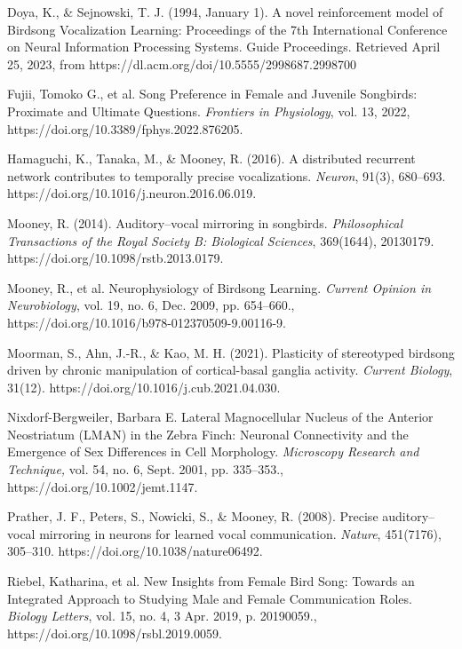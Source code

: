 \documentclass[12pt]{article}
\begin{document}
\newpage
\begin{thebibliography}{10}

 Doya, K., \& Sejnowski, T. J. (1994, January 1). A novel reinforcement model of Birdsong Vocalization Learning: Proceedings of the 7th International Conference on Neural Information Processing Systems. Guide Proceedings. Retrieved April 25, 2023, from https://dl.acm.org/doi/10.5555/2998687.2998700 

 Fujii, Tomoko G., et al. Song Preference in Female and Juvenile Songbirds: Proximate and Ultimate Questions.\textit{ Frontiers in Physiology}, vol. 13, 2022, https://doi.org/10.3389/fphys.2022.876205.

 Hamaguchi, K., Tanaka, M., \& Mooney, R. (2016). A distributed recurrent network contributes to temporally precise vocalizations. \textit{Neuron}, 91(3), 680–693. https://doi.org/10.1016/j.neuron.2016.06.019.

 Mooney, R. (2014). Auditory–vocal mirroring in songbirds. \textit{Philosophical Transactions of the Royal Society B: Biological Sciences}, 369(1644), 20130179. https://doi.org/10.1098/rstb.2013.0179.

 Mooney, R., et al. Neurophysiology of Birdsong Learning. \textit{Current Opinion in Neurobiology}, vol. 19, no. 6, Dec. 2009, pp. 654–660., https://doi.org/10.1016/b978-012370509-9.00116-9.

 Moorman, S., Ahn, J.-R., \& Kao, M. H. (2021). Plasticity of stereotyped birdsong driven by chronic manipulation of cortical-basal ganglia activity. \textit{Current Biology}, 31(12). https://doi.org/10.1016/j.cub.2021.04.030.

 Nixdorf-Bergweiler, Barbara E. Lateral Magnocellular Nucleus of the Anterior Neostriatum (LMAN) in the Zebra Finch: Neuronal Connectivity and the Emergence of Sex Differences in Cell Morphology. \textit{Microscopy Research and Technique,} vol. 54, no. 6, Sept. 2001, pp. 335–353., https://doi.org/10.1002/jemt.1147.

 Prather, J. F., Peters, S., Nowicki, S., \& Mooney, R. (2008). Precise auditory–vocal mirroring in neurons for learned vocal communication. \textit{Nature}, 451(7176), 305–310. https://doi.org/10.1038/nature06492.

 Riebel, Katharina, et al. New Insights from Female Bird Song: Towards an Integrated Approach to Studying Male and Female Communication Roles. \textit{Biology Letters}, vol. 15, no. 4, 3 Apr. 2019, p. 20190059., https://doi.org/10.1098/rsbl.2019.0059.

\end{thebibliography}
\end{document}
